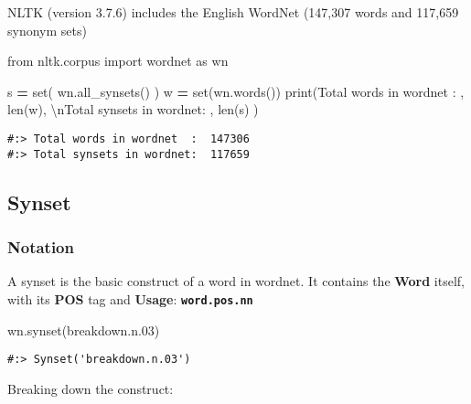 \documentclass[
]{book}
\newenvironment{Shaded}{\begin{snugshade}}{\end{snugshade}}
\newcommand{\BuiltInTok}[1]{#1}
\newcommand{\CharTok}[1]{\textcolor[rgb]{0.5,0.5,0.5}{#1}}
\newcommand{\ImportTok}[1]{#1}
\newcommand{\NormalTok}[1]{#1}
\newcommand{\OperatorTok}[1]{\textcolor[rgb]{0.43,0.43,0.43}{\textbf{#1}}}
\newcommand{\StringTok}[1]{\textcolor[rgb]{0.5,0.5,0.5}{#1}}
\begin{document}
NLTK (version 3.7.6) includes the English WordNet (147,307 words and 117,659 synonym sets)

\begin{Shaded}
\begin{Highlighting}[]
\ImportTok{from}\NormalTok{ nltk.corpus }\ImportTok{import}\NormalTok{ wordnet }\ImportTok{as}\NormalTok{ wn}

\NormalTok{s }\OperatorTok{=} \BuiltInTok{set}\NormalTok{( wn.all\_synsets() )}
\NormalTok{w }\OperatorTok{=} \BuiltInTok{set}\NormalTok{(wn.words())}
\BuiltInTok{print}\NormalTok{(}\StringTok{\textquotesingle{}Total words in wordnet  : \textquotesingle{}}\NormalTok{ ,   }\BuiltInTok{len}\NormalTok{(w),}
      \StringTok{\textquotesingle{}}\CharTok{\textbackslash{}n}\StringTok{Total synsets in wordnet: \textquotesingle{}}\NormalTok{ , }\BuiltInTok{len}\NormalTok{(s) )}
\end{Highlighting}
\end{Shaded}

\begin{verbatim}
#:> Total words in wordnet  :  147306 
#:> Total synsets in wordnet:  117659
\end{verbatim}

\hypertarget{synset}{%
\subsection{Synset}\label{synset}}

\hypertarget{notation}{%
\subsubsection{Notation}\label{notation}}

A synset is the basic construct of a word in wordnet. It contains the \textbf{Word} itself, with its \textbf{POS} tag and \textbf{Usage}: \textbf{\texttt{word.pos.nn}}

\begin{Shaded}
\begin{Highlighting}[]
\NormalTok{wn.synset(}\StringTok{\textquotesingle{}breakdown.n.03\textquotesingle{}}\NormalTok{)}
\end{Highlighting}
\end{Shaded}

\begin{verbatim}
#:> Synset('breakdown.n.03')
\end{verbatim}

Breaking down the construct:
\end{document}
